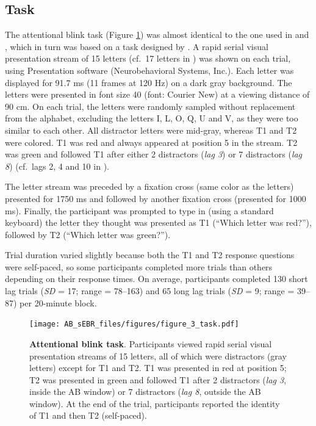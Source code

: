 \documentclass[11pt,english,]{memoir}
\begin{document}
\hypertarget{AB_sEBR-task}{%
\subsection{Task}\label{AB_sEBR-task}}

The attentional blink task (Figure \ref{fig:AB-sEBR-fig-task}) was almost identical to the one used in \textcite{London2015} and \textcite{Slagter2013}, which in turn was based on a task designed by \textcite{Dux2008}. A rapid serial visual presentation stream of 15 letters (cf.~17 letters in \textcite{London2015}) was shown on each trial, using Presentation software (Neurobehavioral Systems, Inc.). Each letter was displayed for 91.7 ms (11 frames at 120 Hz) on a dark gray background. The letters were presented in font size 40 (font: Courier New) at a viewing distance of 90 cm. On each trial, the letters were randomly sampled without replacement from the alphabet, excluding the letters I, L, O, Q, U and V, as they were too similar to each other. All distractor letters were mid-gray, whereas T1 and T2 were colored. T1 was red and always appeared at position 5 in the stream. T2 was green and followed T1 after either 2 distractors (\emph{lag 3}) or 7 distractors (\emph{lag 8}) (cf.~lags 2, 4 and 10 in \textcite{London2015}).

The letter stream was preceded by a fixation cross (same color as the letters) presented for 1750 ms and followed by another fixation cross (presented for 1000 ms). Finally, the participant was prompted to type in (using a standard keyboard) the letter they thought was presented as T1 (``Which letter was red?''), followed by T2 (``Which letter was green?'').

Trial duration varied slightly because both the T1 and T2 response questions were self-paced, so some participants completed more trials than others depending on their response times. On average, participants completed 130 short lag trials (\emph{SD} = 17; range = 78--163) and 65 long lag trials (\emph{SD} = 9; range = 39--87) per 20-minute block.

\begin{figure}
\centering
\texttt{[image: AB\_sEBR\_files/figures/figure\_3\_task.pdf]}
\caption{\label{fig:AB-sEBR-fig-task}\textbf{Attentional blink task}. Participants viewed rapid serial visual presentation streams of 15 letters, all of which were distractors (gray letters) except for T1 and T2. T1 was presented in red at position 5; T2 was presented in green and followed T1 after 2 distractors (\emph{lag 3}, inside the AB window) or 7 distractors (\emph{lag 8}, outside the AB window). At the end of the trial, participants reported the identity of T1 and then T2 (self-paced).}
\end{figure}
\end{document}
